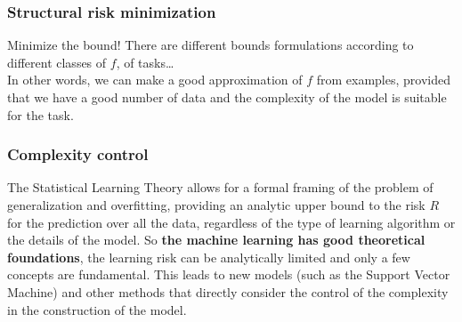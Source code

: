 \documentclass[10pt]{report}
\begin{document}
\subsubsection{Structural risk minimization} Minimize the bound! There are different bounds formulations according to different classes of $f$, of tasks\ldots\\
In other words, we can make a good approximation of $f$ from examples, provided that we have a good number of data and the complexity of the model is suitable for the task.
\subsubsection{Complexity control} The Statistical Learning Theory allows for a formal framing of the problem of generalization and overfitting, providing an analytic upper bound to the risk $R$ for the prediction over all the data, regardless of the type of learning algorithm or the details of the model. So \textbf{the machine learning has good theoretical foundations}, the learning risk can be analytically limited and only a few concepts are fundamental. This leads to new models (such as the Support Vector Machine) and other methods that directly consider the control of the complexity in the construction of the model.
\end{document}

